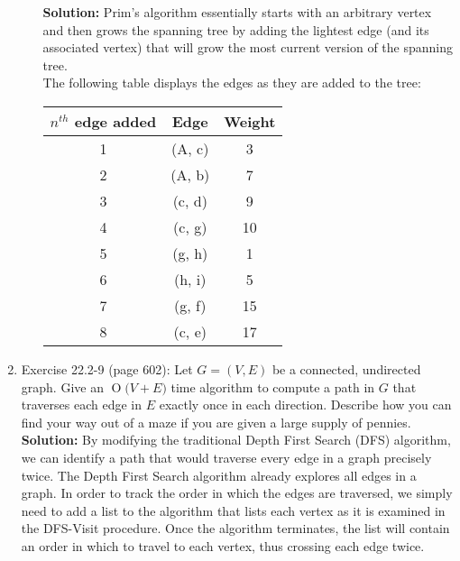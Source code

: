 \documentclass[11pts]{article}
\newcommand{\BigO}[1]{\ensuremath{\operatorname{O}\bigl(#1\bigr)}}
\begin{document}
\begin{enumerate}
\begin{enumerate}
  \textbf{Solution:} Prim's algorithm essentially starts with an arbitrary
  vertex and then grows the spanning tree by adding the lightest edge 
  (and its associated vertex) that
  will grow the most current version of the spanning tree.\\

  The following table displays the edges as they are added to the tree:

    \begin{center}
    \begin{tabular}{| c | c | c |}
      \hline
        $n^{th}$ edge added & Edge   & Weight \\
      \hline \hline
           1                & (A, c) &    3 \\
      \hline
           2                & (A, b) &    7 \\
      \hline
           3                & (c, d) &    9 \\
      \hline
           4                & (c, g) &   10 \\
      \hline
           5                & (g, h) &    1 \\
      \hline
           6                & (h, i) &    5 \\
      \hline
           7                & (g, f) &   15 \\
      \hline
           8                & (c, e) &   17 \\
      \hline
    \end{tabular}
    \end{center}
  \end{enumerate}

\newpage
\item Exercise 22.2-9 (page 602): Let $G = ( V, E )$ be a connected,
undirected graph. Give an \BigO{ V + E } time algorithm to compute a path in
$G$ that traverses each edge in $E$ exactly once in each direction. Describe
how you can find your way out of a maze if you are given a large
supply of pennies.\\

  \textbf{Solution:} By modifying the traditional Depth First Search (DFS)
  algorithm, we can identify a path that would traverse every edge in a graph
  precisely twice. The Depth First Search algorithm already explores all
  edges in a graph. In order to track the order in which the edges are
  traversed, we simply need to add a list to the algorithm that lists each
  vertex as it is examined in the DFS-Visit procedure. Once the algorithm
  terminates, the list will contain an order in which to travel to each
  vertex, thus crossing each edge twice. \\


\end{enumerate}
\end{document}
